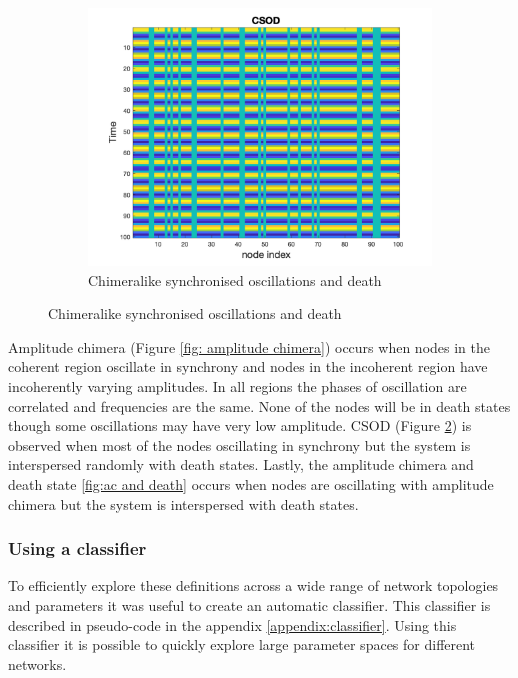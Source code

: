 \documentclass[12pt]{article}
\begin{document}
\begin{figure}[h]
\begin{subfigure}[b]{0.4\textwidth}
    \centering
    \includegraphics[width=\textwidth]{General Diagrams/CSOD.png}
    \caption{Chimeralike synchronised oscillations and death}
    \label{fig: CSOD}
\end{subfigure}
\hfill
\end{figure}

Amplitude chimera (Figure \ref{fig: amplitude chimera}) occurs when nodes in the coherent region oscillate in synchrony and nodes in the incoherent region have incoherently varying amplitudes. In all regions the phases of oscillation are correlated and frequencies are the same. None of the nodes will be in death states though some oscillations may have very low amplitude. CSOD (Figure \ref{fig: CSOD}) is observed when most of the nodes oscillating in synchrony but the system is interspersed randomly with death states. Lastly, the amplitude chimera and death state \ref{fig:ac and death} occurs when nodes are oscillating with amplitude chimera but the system is interspersed with death states.

\subsubsection{Using a classifier}
To efficiently explore these definitions across a wide range of network topologies and parameters it was useful to create an automatic classifier. This classifier is described in pseudo-code in the appendix \ref{appendix:classifier}. Using this classifier it is possible to quickly explore large parameter spaces for different networks.
\end{document}
